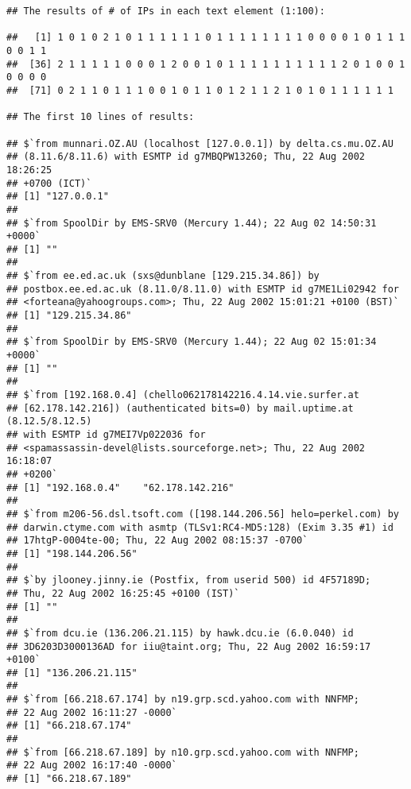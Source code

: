 \documentclass{article}\usepackage{graphicx, color}
\makeatletter
\newenvironment{kframe}{%
 \def\at@end@of@kframe{}%
 \ifinner\ifhmode%
  \def\at@end@of@kframe{\end{minipage}}%
  \begin{minipage}{\columnwidth}%
 \fi\fi%
 \def\FrameCommand##1{\hskip\@totalleftmargin \hskip-\fboxsep
 \colorbox{shadecolor}{##1}\hskip-\fboxsep
     \hskip-\linewidth \hskip-\@totalleftmargin \hskip\columnwidth}%
 \MakeFramed {\advance\hsize-\width
   \@totalleftmargin\z@ \linewidth\hsize
   \@setminipage}}%
 {\par\unskip\endMakeFramed%
 \at@end@of@kframe}
\newenvironment{knitrout}{}{} %
\makeatother
\begin{document}
\begin{knitrout}
\color{fgcolor}\begin{kframe}
\begin{verbatim}
## The results of # of IPs in each text element (1:100):

##   [1] 1 0 1 0 2 1 0 1 1 1 1 1 1 0 1 1 1 1 1 1 1 1 0 0 0 0 1 0 1 1 1 0 0 1 1
##  [36] 2 1 1 1 1 1 0 0 0 1 2 0 0 1 0 1 1 1 1 1 1 1 1 1 1 2 0 1 0 0 1 0 0 0 0
##  [71] 0 2 1 1 0 1 1 1 0 0 1 0 1 1 0 1 2 1 1 2 1 0 1 0 1 1 1 1 1 1

## The first 10 lines of results:

## $`from munnari.OZ.AU (localhost [127.0.0.1]) by delta.cs.mu.OZ.AU
## (8.11.6/8.11.6) with ESMTP id g7MBQPW13260; Thu, 22 Aug 2002 18:26:25
## +0700 (ICT)`
## [1] "127.0.0.1"
## 
## $`from SpoolDir by EMS-SRV0 (Mercury 1.44); 22 Aug 02 14:50:31 +0000`
## [1] ""
## 
## $`from ee.ed.ac.uk (sxs@dunblane [129.215.34.86]) by
## postbox.ee.ed.ac.uk (8.11.0/8.11.0) with ESMTP id g7ME1Li02942 for
## <forteana@yahoogroups.com>; Thu, 22 Aug 2002 15:01:21 +0100 (BST)`
## [1] "129.215.34.86"
## 
## $`from SpoolDir by EMS-SRV0 (Mercury 1.44); 22 Aug 02 15:01:34 +0000`
## [1] ""
## 
## $`from [192.168.0.4] (chello062178142216.4.14.vie.surfer.at
## [62.178.142.216]) (authenticated bits=0) by mail.uptime.at (8.12.5/8.12.5)
## with ESMTP id g7MEI7Vp022036 for
## <spamassassin-devel@lists.sourceforge.net>; Thu, 22 Aug 2002 16:18:07
## +0200`
## [1] "192.168.0.4"    "62.178.142.216"
## 
## $`from m206-56.dsl.tsoft.com ([198.144.206.56] helo=perkel.com) by
## darwin.ctyme.com with asmtp (TLSv1:RC4-MD5:128) (Exim 3.35 #1) id
## 17htgP-0004te-00; Thu, 22 Aug 2002 08:15:37 -0700`
## [1] "198.144.206.56"
## 
## $`by jlooney.jinny.ie (Postfix, from userid 500) id 4F57189D;
## Thu, 22 Aug 2002 16:25:45 +0100 (IST)`
## [1] ""
## 
## $`from dcu.ie (136.206.21.115) by hawk.dcu.ie (6.0.040) id
## 3D6203D3000136AD for iiu@taint.org; Thu, 22 Aug 2002 16:59:17 +0100`
## [1] "136.206.21.115"
## 
## $`from [66.218.67.174] by n19.grp.scd.yahoo.com with NNFMP;
## 22 Aug 2002 16:11:27 -0000`
## [1] "66.218.67.174"
## 
## $`from [66.218.67.189] by n10.grp.scd.yahoo.com with NNFMP;
## 22 Aug 2002 16:17:40 -0000`
## [1] "66.218.67.189"
\end{verbatim}
\end{kframe}
\end{knitrout}
\end{document}
